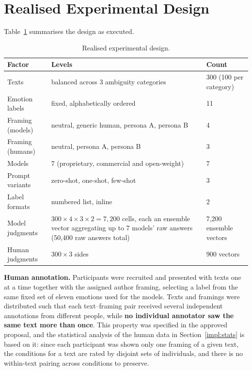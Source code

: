 \section{Realised Experimental Design}
\label{meth:design}

\noindent
Table~\ref{tab:design} summarises the design as executed.

\begin{table}[h]
\centering
\footnotesize
\caption{Realised experimental design.}
\label{tab:design}
\begin{tabular}{lp{7.5cm}l}
\hline
\textbf{Factor} & \textbf{Levels} & \textbf{Count} \\
\hline
Texts & balanced across 3 ambiguity categories & 300 (100 per category) \\
Emotion labels & fixed, alphabetically ordered & 11 \\
Framing (models) & neutral, generic human, persona A, persona B & 4 \\
Framing (humans) & neutral, persona A, persona B & 3 \\
Models & 7 (proprietary, commercial and open-weight) & 7 \\
Prompt variants & zero-shot, one-shot, few-shot & 3 \\
Label formats & numbered list, inline & 2 \\
\hline
Model judgments & $300 \times 4 \times 3 \times 2 = 7{,}200$ cells, each an ensemble vector aggregating up to 7 models' raw answers (50{,}400 raw answers total) & 7{,}200 ensemble vectors \\
Human judgments & $300 \times 3$ sides & 900 vectors \\
\hline
\end{tabular}
\end{table}

\noindent
\textbf{Human annotation.} Participants were recruited and presented with texts one at a time
together with the assigned author framing, selecting a label from the same fixed set of eleven
emotions used for the models. Texts and framings were distributed such that each text--framing
pair received several independent annotations from different people, while \textbf{no individual
annotator saw the same text more than once}. This property was specified in the approved
proposal, and the statistical analysis of the human data in Section~\ref{impl:stats} is based on
it: since each participant was shown only one framing of a given text, the conditions for a text
are rated by disjoint sets of individuals, and there is no within-text pairing across conditions
to preserve.

